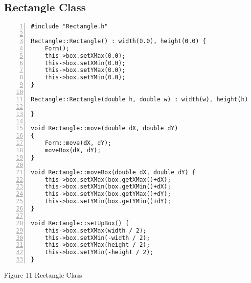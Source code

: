 \documentclass{llncs}
\begin{document}
\subsection{Rectangle Class}
\begin{lstlisting}[basicstyle=\footnotesize\ttfamily, numbers=left, stepnumber=1, numberstyle = \normalsize]
#include "Rectangle.h"

Rectangle::Rectangle() : width(0.0), height(0.0) {
	Form();
	this->box.setXMax(0.0);
	this->box.setXMin(0.0);
	this->box.setYMax(0.0);
	this->box.setYMin(0.0);
}

Rectangle::Rectangle(double h, double w) : width(w), height(h) {

}

void Rectangle::move(double dX, double dY)
{
	Form::move(dX, dY);
	moveBox(dX, dY);
}

void Rectangle::moveBox(double dX, double dY) {
	this->box.setXMax(box.getXMax()+dX);
	this->box.setXMin(box.getXMin()+dX);
	this->box.setYMax(box.getYMax()+dY);
	this->box.setYMin(box.getYMin()+dY);
}

void Rectangle::setUpBox() {
	this->box.setXMax(width / 2);
	this->box.setXMin(-width / 2);
	this->box.setYMax(height / 2);
	this->box.setYMin(-height / 2);
}
\end{lstlisting}
\scriptsize{Figure 11 Rectangle Class}\newline
\newline
\newline
\end{document}
